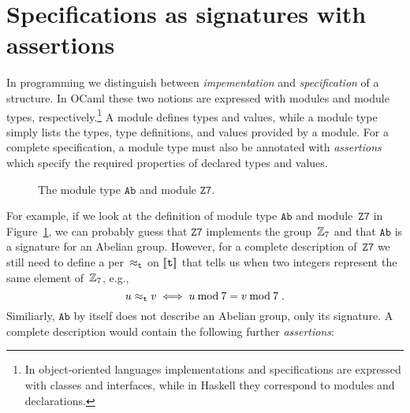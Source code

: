 \section{Specifications as signatures with assertions}
\label{sec:spec-sign-assert}


In programming we distinguish between \emph{impementation} and
\emph{specification} of a structure. In OCaml these two notions are
expressed with modules and module types, respectively.\footnote{In
  object-oriented languages implementations and specifications are
  expressed with classes and interfaces, while in Haskell they
  correspond to modules and declarations.} A module defines types and
values, while a module type simply lists the types, type definitions,
and values provided by a module. For a complete specification, a
module type must also be annotated with \emph{assertions} which
specify the required properties of declared types and values.
%
\begin{figure}
  \centering
  \caption{The module type $\mathtt{Ab}$ and module
    $\mathtt{Z7}$.}
  \label{fig:module-example}
\end{figure}
%
For example, if we look at the definition of module type $\mathtt{Ab}$
and module~$\mathtt{Z7}$ in Figure~\ref{fig:module-example}, we can
probably guess that $\mathtt{Z7}$ implements the group~$\mathbb{Z}_7$ and
that $\mathtt{Ab}$ is a signature for an Abelian group. However, for a
complete description of~$\mathtt{Z7}$ we still need to define a
per~$\approx_{\mathtt{t}}$ on $[\![\mathtt{t}]\!]$ that tells us when two
integers represent the same element of~$\mathbb{Z}_7$, e.g.,
%
\begin{equation*}
  u \approx_{\mathtt{t}} v \iff
  u \mathbin{\mathrm{mod}} 7 = v \mathbin{\mathrm{mod}} 7 \;.
\end{equation*}
%
Similiarly, $\mathtt{Ab}$ by itself does not describe an Abelian
group, only its signature. A complete description would contain the
following further \emph{assertions}:
%
